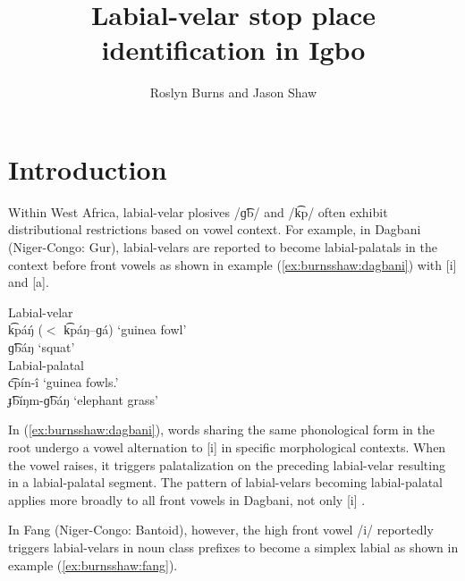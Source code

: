\documentclass[output=paper,colorlinks,citecolor=brown
]{langscibook}
\author{Roslyn Burns{}\affiliation{Yale University} and
        Jason Shaw{}\affiliation{Yale University}}
\title{Labial-velar stop place identification in Igbo}
\begin{document}
\maketitle


\section{Introduction}
Within West Africa, labial-velar plosives /ɡ͡b/ and /k͡p/ often exhibit distributional restrictions based on vowel context. For example, in Dagbani (Niger-Congo: Gur), labial-velars are reported to become labial-palatals in the context before front vowels as shown in example (\ref{ex:burnsshaw:dagbani}) with [i] and [a].
\largerpage
\TabPositions{4cm,6cm,81cm}

\ea \label{ex:burnsshaw:dagbani}
\ea Labial-velar\\
k͡páŋ́ ($<$ k͡páŋ--ɡá) \tab ‘guinea fowl’\\
ɡ͡báŋ \tab ‘squat’\\

\ex Labial-palatal\\
c͡pín-î \tab ‘guinea fowls.'\\
ɟ͡bíŋm-ɡ͡báŋ \tab ‘elephant grass’\\

\z
\citep{Hudu2014,Bennett2014}
\z

\noindent In (\ref{ex:burnsshaw:dagbani}), words sharing the same phonological form in the root undergo a vowel alternation to [i] in specific morphological contexts. When the vowel raises, it triggers palatalization on the preceding labial-velar resulting in a labial-palatal segment. The pattern of labial-velars becoming labial-palatal applies more broadly to all front vowels in Dagbani, not only [i] \citep[116]{Bennett2014}.

In Fang (Niger-Congo: Bantoid), however, the high front vowel /i/ reportedly triggers labial-velars in noun class prefixes to become a simplex labial as shown in example (\ref{ex:burnsshaw:fang}).
\end{document}
